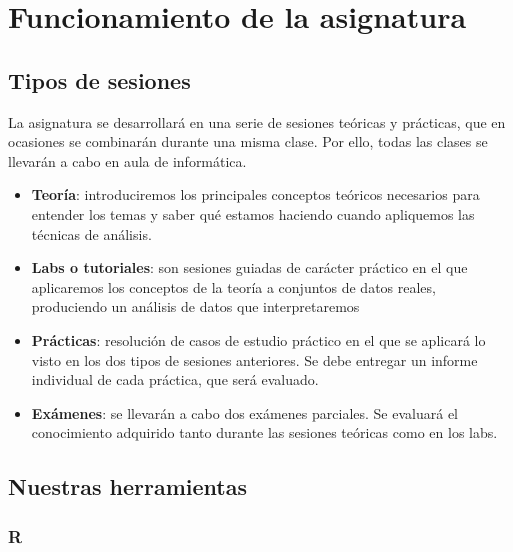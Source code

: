 \documentclass[
  letterpaper,
  DIV=11,
  numbers=noendperiod]{scrreprt}
\begin{document}
\hypertarget{funcionamiento-de-la-asignatura}{%
\section*{Funcionamiento de la
asignatura}\label{funcionamiento-de-la-asignatura}}


\hypertarget{tipos-de-sesiones}{%
\subsection*{Tipos de sesiones}\label{tipos-de-sesiones}}

La asignatura se desarrollará en una serie de sesiones teóricas y
prácticas, que en ocasiones se combinarán durante una misma clase. Por
ello, todas las clases se llevarán a cabo en aula de informática.

\begin{itemize}
\item
  \textbf{Teoría}: introduciremos los principales conceptos teóricos
  necesarios para entender los temas y saber qué estamos haciendo cuando
  apliquemos las técnicas de análisis.
\item
  \textbf{Labs o tutoriales}: son sesiones guiadas de carácter práctico
  en el que aplicaremos los conceptos de la teoría a conjuntos de datos
  reales, produciendo un análisis de datos que interpretaremos
\item
  \textbf{Prácticas}: resolución de casos de estudio práctico en el que
  se aplicará lo visto en los dos tipos de sesiones anteriores. Se debe
  entregar un informe individual de cada práctica, que será evaluado.
\item
  \textbf{Exámenes}: se llevarán a cabo dos exámenes parciales. Se
  evaluará el conocimiento adquirido tanto durante las sesiones teóricas
  como en los labs.
\end{itemize}

\hypertarget{nuestras-herramientas}{%
\subsection*{Nuestras herramientas}\label{nuestras-herramientas}}

\hypertarget{r}{%
\subsubsection*{R}\label{r}}
\end{document}
